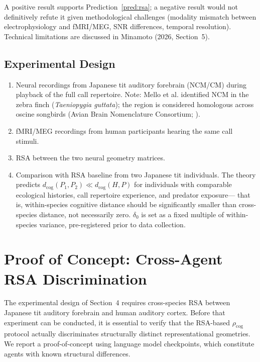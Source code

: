 \documentclass[12pt]{article}
\begin{document}
A positive result supports Prediction~\ref{pred:rsa};
a negative result would not definitively refute it
given methodological challenges (modality mismatch between
electrophysiology and fMRI/MEG, SNR differences, temporal resolution).
Technical limitations are discussed in Minamoto (2026, Section~5).

\subsection{Experimental Design}

\begin{enumerate}
\item Neural recordings from Japanese tit auditory forebrain (NCM/CM)
      during playback of the full call repertoire.
      Note: Mello et al. \citeyearpar{mello1992} identified NCM
      in the zebra finch (\textit{Taeniopygia guttata}); the region is
      considered homologous across oscine songbirds
      (Avian Brain Nomenclature Consortium; \citealt{jarvis2005}).
\item fMRI/MEG recordings from human participants
      hearing the same call stimuli.
\item RSA \citep{kriegeskorte2008} between the two neural geometry matrices.
\item Comparison with RSA baseline from two Japanese tit individuals.
      The theory predicts $d_\mathrm{cog}(P_1, P_2) \ll d_\mathrm{cog}(H, P)$
      for individuals with comparable ecological histories,
      call repertoire experience, and predator exposure---
      that is, within-species cognitive distance should be
      significantly smaller than cross-species distance,
      not necessarily zero.
      $\delta_0$ is set as a fixed multiple of within-species variance,
      pre-registered prior to data collection.
\end{enumerate}

\section{Proof of Concept: Cross-Agent RSA Discrimination}
\label{sec:pilot}

The experimental design of Section~4 requires cross-species RSA
between Japanese tit auditory forebrain and human auditory cortex.
Before that experiment can be conducted, it is essential to verify
that the RSA-based $\rho_\mathrm{cog}$ protocol actually
discriminates structurally distinct representational geometries.
We report a proof-of-concept using language model checkpoints,
which constitute agents with known structural differences.
\end{document}
